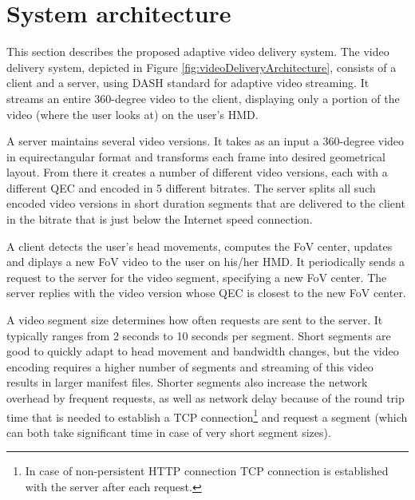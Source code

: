 \section{System architecture}

This section describes the proposed adaptive video delivery system. The video delivery system, depicted in Figure \ref{fig:videoDeliveryArchitecture}, consists of a client and a server, using DASH standard \cite{Stockhammer11} for adaptive video streaming. It streams an entire 360-degree video to the client, displaying only a portion of the video (where the user looks at) on the user's HMD.



A server maintains several video versions. It takes as an input a 360-degree video in equirectangular format and transforms each frame into desired geometrical layout. From there it creates a number of different video versions, each with a different QEC and encoded in 5 different bitrates.
 The server splits all such encoded video versions in short duration segments that are delivered to the client in the bitrate that is just below the Internet speed connection.

A client detects the user's head movements, computes the FoV center, updates and diplays a new FoV video to the user on his/her HMD. It periodically sends a request to the server for the video segment, specifying a new FoV center. The server replies with the video version whose QEC is closest to the new FoV center.

A video segment size determines how often requests are sent to the server. It typically ranges from 2 seconds to 10 seconds per segment. Short segments are good to quickly adapt to head movement and bandwidth changes, but the video encoding requires a higher number of segments and streaming of this video results in larger manifest files. Shorter segments also increase the network overhead by frequent requests, as well as network delay because of the round trip time that is needed to establish a TCP connection\footnote{In case of non-persistent HTTP connection TCP connection is established with the server after each request.} and request a segment (which can both take significant time in case of very short segment sizes).

